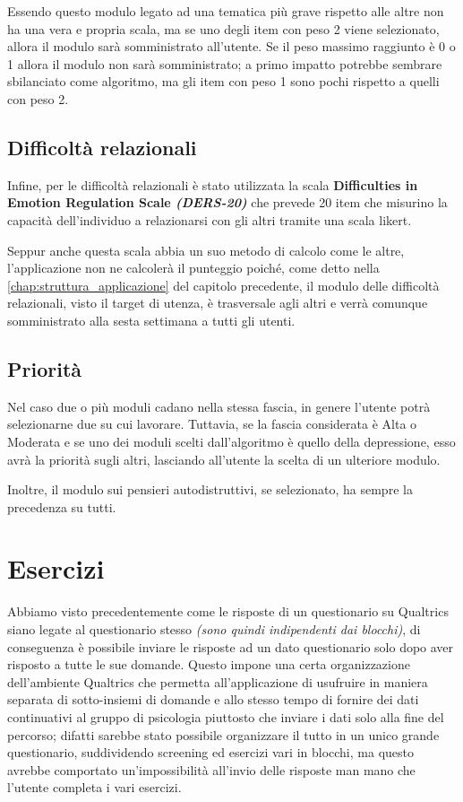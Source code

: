 Essendo questo modulo legato ad una tematica più grave rispetto alle altre non ha una vera e propria scala, ma se uno degli item con peso 2 viene selezionato, allora il modulo sarà somministrato all'utente. Se il peso massimo raggiunto è 0 o 1 allora il modulo non sarà somministrato; a primo impatto potrebbe sembrare sbilanciato come algoritmo, ma gli item con peso 1 sono pochi rispetto a quelli con peso 2.

\subsection{Difficoltà relazionali}
Infine, per le difficoltà relazionali è stato utilizzata la scala \textbf{Difficulties in Emotion Regulation Scale \textit{(DERS-20)}}\cite{DERS-20} che prevede 20 item che misurino la capacità dell'individuo a relazionarsi con gli altri tramite una scala likert.

Seppur anche questa scala abbia un suo metodo di calcolo come le altre, l'applicazione non ne calcolerà il punteggio poiché, come detto nella \autoref{chap:struttura_applicazione} del capitolo precedente, il modulo delle difficoltà relazionali, visto il target di utenza, è trasversale agli altri e verrà comunque somministrato alla sesta settimana a tutti gli utenti.

\subsection{Priorità}
Nel caso due o più moduli cadano nella stessa fascia, in genere l'utente potrà selezionarne due su cui lavorare. Tuttavia, se la fascia considerata è Alta o Moderata e se uno dei moduli scelti dall'algoritmo è quello della depressione, esso avrà la priorità sugli altri, lasciando all'utente la scelta di un ulteriore modulo.

Inoltre, il modulo sui pensieri autodistruttivi, se selezionato, ha sempre la precedenza su tutti.

\newpage
\section{Esercizi}
Abbiamo visto precedentemente come le risposte di un questionario su Qualtrics siano legate al questionario stesso \textit{(sono quindi indipendenti dai blocchi)}, di conseguenza è possibile inviare le risposte ad un dato questionario solo dopo aver risposto a tutte le sue domande. Questo impone una certa organizzazione dell'ambiente Qualtrics che permetta all'applicazione di usufruire in maniera separata di sotto-insiemi di domande e allo stesso tempo di fornire dei dati continuativi al gruppo di psicologia piuttosto che inviare i dati solo alla fine del percorso; difatti sarebbe stato possibile organizzare il tutto in un unico grande questionario, suddividendo screening ed esercizi vari in blocchi, ma questo avrebbe comportato un'impossibilità all'invio delle risposte man mano che l'utente completa i vari esercizi.

